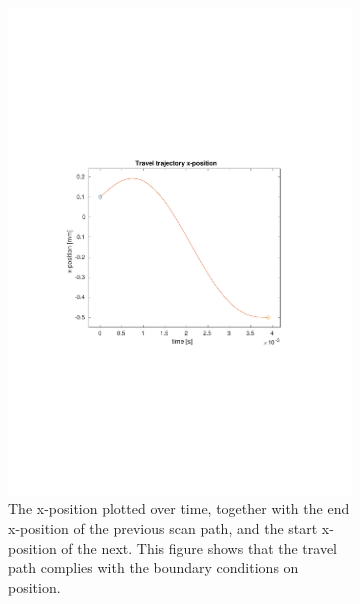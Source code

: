 \begin{figure}
\begin{subfigure}{0.72\textwidth}
        \includegraphics[clip, trim=3.5cm 9cm 4cm 9cm, width=\textwidth]{Pictures/5-traj-pos.pdf}
        \caption{The x-position plotted over time, together with the end x-position of the previous scan path, and the start x-position of the next. This figure shows that the travel path complies with the boundary conditions on position.}
        \label{fig:5-traj-pos-t}
    \end{subfigure}
    \caption{}
    \label{fig:5-traj-pos}
\end{figure}

